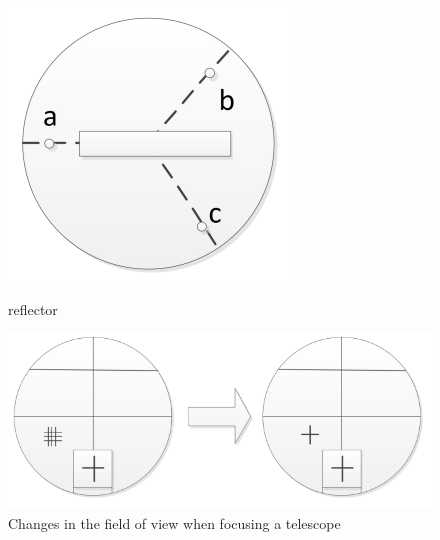 \documentclass[UTF8]{article}
\begin{document}
     \begin{figure}[H]
                          			\begin{minipage}[t]{0.3\linewidth}
                          				\centering
                          				\includegraphics[clip,scale=1.0,trim={0 0 0 0}]{fig/fig13.png}
                          				\caption{ reflector}
                          				\label{figure.13}
                          			\end{minipage}
                          			\begin{minipage}[t]{0.7\linewidth}
                          				\centering
                          				\includegraphics[clip,scale=1,trim={0 4 0 0}]{fig/fig14.png}
                          				\caption{Changes in the field of view when focusing a telescope}
                          				\label{figure.14}
                          			\end{minipage}
                          		\end{figure}
\end{document}
